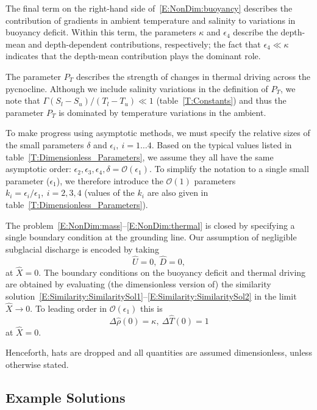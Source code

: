 \documentclass[openacc]{rsproca_new}%
\newcommand{\order}[1]{\mathcal{O}(#1)}
\newcommand{\epsone}{\epsilon_{1}} %
\newcommand{\epstwo}{\epsilon_{2}} %
\newcommand{\epsthree}{\epsilon_{3}} %
\newcommand{\epsfour}{\epsilon_{4}}
\newcommand{\lt}{\delta} %
\newcommand{\Pt}{\textit{P}_T}
\begin{document}
The final term on the right-hand side of~\eqref{E:NonDim:buoyancy} describes the contribution of gradients in ambient temperature and salinity to variations in buoyancy deficit. Within this term, the parameters $\kappa$ and $\epsfour$ describe the depth-mean and depth-dependent contributions, respectively; the fact that $\epsfour \ll \kappa$ indicates that the depth-mean contribution plays the dominant role.

The parameter $\Pt$ describes the strength of changes in thermal driving across the pycnocline. Although we include salinity variations in the definition of $\Pt$, we note that $\Gamma (S_l - S_u)/(T_l - T_u) \ll 1$ (table~\ref{T:Constants}) and thus the parameter $\Pt$ is dominated by temperature variations in the ambient.

To make progress using asymptotic methods, we must specify the relative sizes of the small parameters $\lt$ and $\epsilon_i, ~i = 1\dots4$. Based on the typical values listed in table~\ref{T:Dimensionless_Parameters}, we assume they all have the same asymptotic order: $\epstwo, \epsthree, \epsfour, \lt = \order{\epsone}$. To simplify the notation to a single small parameter ($\epsone$), we therefore introduce the $\order{1}$ parameters $k_i =\epsilon_i/ \epsone,~i = 2,3,4$ (values of the $k_i$ are also given in table~\ref{T:Dimensionless_Parameters}).

The problem~\eqref{E:NonDim:mass}--\eqref{E:NonDim:thermal} is closed by specifying a single boundary condition at the grounding line. Our assumption of negligible subglacial discharge is encoded by taking
\begin{equation}\label{E:NonDim:IC1}
\hat{U} =0,~\hat{D} = 0,
\end{equation}
at $\hat{X} = 0$. The boundary conditions on the buoyancy deficit and thermal driving are obtained by evaluating (the dimensionless version of) the similarity solution~\eqref{E:Similarity:SimilaritySol1}--\eqref{E:Similarity:SimilaritySol2} in the limit $\hat{X} \to 0$. To leading order in $\order{\epsone}$ this is
\begin{equation}\label{E:NonDim:IC2}
  \Delta\hat{\rho}(0) = \kappa,~\Delta \hat{T}(0) = 1  
\end{equation}
at $\hat{X} = 0$.

Henceforth, hats are dropped and all quantities are assumed dimensionless, unless otherwise stated.

\subsection{Example Solutions}\label{S:ExampleSolutions}
\end{document}
